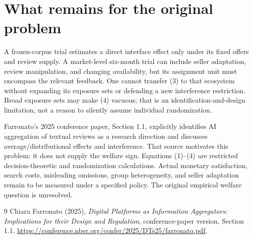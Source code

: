 \documentclass[11pt]{article}
\begin{document}
\section{What remains for the original problem}
A frozen-corpus trial estimates a direct interface effect only under its
fixed offers and review supply. A market-level six-month trial can include
seller adaptation, review manipulation, and changing availability, but its
assignment unit must encompass the relevant feedback. One cannot transfer
(3) to that ecosystem without expanding its exposure sets or defending a
new interference restriction. Broad exposure sets may make (4) vacuous;
that is an identification-and-design limitation, not a reason to silently
assume individual randomization.

Farronato's 2025 conference paper, Section 1.1, explicitly identifies
AI aggregation of textual reviews as a research direction and discusses
average/distributional effects and interference. That source motivates
this problem; it does not supply the welfare sign. Equations (1)--(4)
are restricted decision-theoretic and randomization calculations.
Actual monetary satisfaction, search costs, misleading omissions, group
heterogeneity, and seller adaptation remain to be measured under a
specified policy. The original empirical welfare question is unresolved.

\begin{thebibliography}{9}
 Chiara Farronato (2025),
\emph{Digital Platforms as Information Aggregators: Implications for their
Design and Regulation}, conference-paper version, Section 1.1.
\url{https://conference.nber.org/confer/2025/DTs25/farronato.pdf}.
\end{thebibliography}
\end{document}
